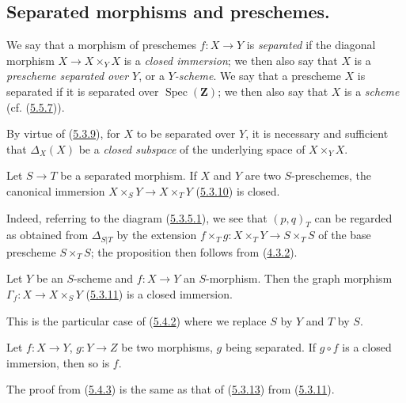 \subsection{Separated morphisms and preschemes.}
\label{subsection:I.5.4}

\begin{definition}[5.4.1]
\label{I.5.4.1}
We say that a morphism of preschemes $f:X\to Y$ is \emph{separated} if the
diagonal morphism $X\to X\times_Y X$ is a \emph{closed immersion}; we
then also say that $X$ is a \emph{prescheme separated over $Y$}, or a
\emph{$Y$-scheme}. We say that a prescheme $X$ is separated if it is
separated over $\operatorname{Spec}(\mathbf{Z})$; we then also say that $X$
is a \emph{scheme} (cf. (\hyperref[I.5.5.7]{5.5.7})).
\end{definition}

By virtue of (\hyperref[I.5.3.9]{5.3.9}), for $X$ to be separated over
$Y$, it is necessary and sufficient that $\Delta_X(X)$ be a \emph{closed
subspace} of the underlying space of $X\times_Y X$.

\begin{proposition}[5.4.2]
\label{I.5.4.2}
Let $S\to T$ be a separated morphism. If $X$ and $Y$ are two $S$-preschemes,
the canonical immersion $X\times_S Y\to X\times_T Y$
(\hyperref[I.5.3.10]{5.3.10}) is closed.
\end{proposition}

Indeed, referring to the diagram
(\hyperref[I.5.3.5.1]{5.3.5.1}), we see that $(p,q)_T$ can be regarded
as obtained from $\Delta_{S|T}$ by the extension
$f\times_T g:X\times_T Y\to S\times_T S$ of the base prescheme $S\times_T S$;
the proposition then follows from (\hyperref[I.4.3.2]{4.3.2}).

\begin{corollary}[5.4.3]
\label{I.5.4.3}
Let $Y$ be an $S$-scheme and $f:X\to Y$ an $S$-morphism. Then the graph
morphism $\Gamma_f:X\to X\times_S Y$ (\hyperref[I.5.3.11]{5.3.11}) is a
closed immersion.
\end{corollary}

This is the particular case of (\hyperref[I.5.4.2]{5.4.2}) where we replace
$S$ by $Y$ and $T$ by $S$.

\begin{corollary}[5.4.4]
\label{I.5.4.4}
Let $f:X\to Y$, $g:Y\to Z$ be two morphisms, $g$ being separated. If
$g\circ f$ is a closed immersion, then so is $f$.
\end{corollary}

The proof from (\hyperref[I.5.4.3]{5.4.3}) is the same as
that of (\hyperref[I.5.3.13]{5.3.13}) from
(\hyperref[I.5.3.11]{5.3.11}).

